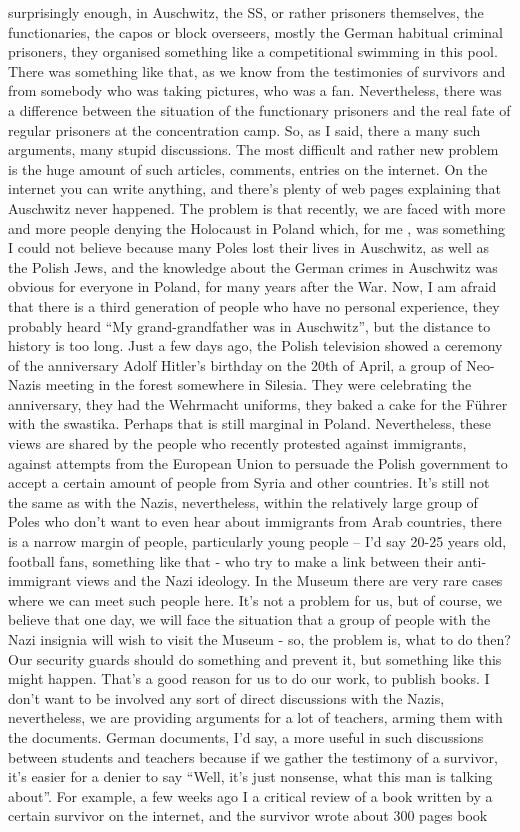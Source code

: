 surprisingly enough, in Auschwitz, the SS, or rather prisoners themselves, the functionaries, the capos or block overseers, mostly the German habitual criminal prisoners, they organised something like a competitional swimming in this pool. There was something like that, as we know from the testimonies of survivors and from somebody who was taking pictures, who was a fan. Nevertheless, there was a difference between the situation of the functionary prisoners and the real fate of regular prisoners at the concentration camp. 
So, as I said, there a many such arguments, many stupid discussions. The most difficult and rather new problem is the huge amount of such articles, comments, entries on the internet. On the internet you can write anything, and there’s plenty of web pages explaining that Auschwitz never happened. The problem is that recently, we are faced with more and more people denying the Holocaust in Poland which, for me , was something I could not believe because many Poles lost their lives in Auschwitz, as well as the Polish Jews, and the knowledge about the German crimes in Auschwitz was obvious for everyone in Poland, for many years after the War. Now, I am afraid that there is a third generation of people who have no personal experience, they probably heard “My grand-grandfather was in Auschwitz”, but the distance to history is too long. Just a few days ago, the Polish television showed a ceremony of the anniversary Adolf Hitler's birthday on the 20th of April, a group of Neo-Nazis meeting in the forest somewhere in Silesia. They were celebrating the anniversary, they had the Wehrmacht uniforms, they baked a cake for the Führer with the swastika. Perhaps that is still marginal in Poland. Nevertheless, these views are shared by the people who recently protested against immigrants, against attempts from the European Union to persuade the Polish government to accept a certain amount of people from Syria and other countries. It's still not the same as with the Nazis, nevertheless, within the relatively large group of Poles who don't want to even hear about immigrants from Arab countries, there is a narrow margin of people, particularly young people – I’d say 20-25 years old, football fans, something like that - who try to make a link between their anti-immigrant views and the Nazi ideology. In the Museum there are very rare cases where we can meet such people here. It's not a problem for us, but of course, we believe that one day, we will face the situation that a group of people with the Nazi insignia will wish to visit the Museum - so, the problem is, what to do then? Our security guards should do something and prevent it, but something like this might happen. That's a good reason for us to do our work, to publish books. I don’t want to be involved any sort of direct discussions with the Nazis, nevertheless, we are providing arguments for a lot of teachers, arming them with the documents. German documents, I'd say, a more useful in such discussions between students and teachers because if we gather the testimony of a survivor, it’s easier for a denier to say “Well, it’s just nonsense, what this man is talking about”. For example, a few weeks ago I a critical review of a book written by a certain survivor on the internet, and the survivor wrote about 300 pages book 